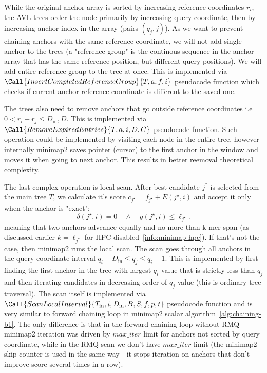While the original anchor array is sorted by increasing reference coordinates $r_i$, the AVL trees order the node primarily by increasing query coordinate, then by increasing anchor index in the array (pairs $(q_j, j)$).
As we want to prevent chaining anchors with the same reference coordinate, we will not add single anchor to the trees (a "reference group" is the continous sequence in the anchor array that has the same reference position, but different query positions).
We will add entire reference group to the tree at once. This is implemented via $\Call{InsertCompletedReferenceGroup}{T,a,f,i}$ pseudocode function which checks if current anchor reference coordinate is different to the saved one.

The trees also need to remove anchors that go outside reference coordinates i.e \(0<r_i-r_j\leq D_{\mathrm{in}}, D\). This is implemented via $\Call{RemoveExpiredEntries}{T,a,i,D,C}$ pseudocode function. Such operation could be implemented by visiting each node in the entire tree, however internally minimap2 saves
pointer (cursor) to the first anchor in the window and moves it when going to next anchor. This results in better reemoval theoretical complexity. 

The last complex operation is local scan. After best candidate $j^{*}$ is selected from the main tree $T$, we calculate it's score \(c_{j^\star}=f_{j^\star}+E(j^\star,i)\) and accept it only when the anchor is "exact":
\begin{equation}
  \delta(j^\star,i)=0
  \quad\land\quad
  g(j^\star,i)\leq\ell_{j^\star}.
  \label{eq:chaining-rmq-exact}
\end{equation}
meaning that two anchors advcance equally and no more than k-mer span (as discussed earlier $k = \ell_{j^\star}$ for HPC disabled~\ref{info:minimap-hpc}). 
If that's not the case, then minimap2 runs the local scan. The scan goes through all anchors in the query coordinate interval $q_i-D_{\mathrm{in}}\leq q_j\leq q_i-1$.
This is implemented by first finding the first anchor in the tree with largest $q_i$ value that is strictly less than $q_j$ and then iterating candidates in decreasing order of $q_j$ value (this is ordinary tree traversal).
The scan itself is implemented via $\Call{ScanLocalInterval}{T_{\mathrm{in}},i,D_{\mathrm{in}},B,S,f,p,t}$ pseudocode function and is very similar to forward chaining loop in minimap2 scalar algorithm~\ref{alg:chaining-b1}. The only difference is that in the forward chaining loop without RMQ
minimap2 iteration was driven by $max\_iter$ limit for anchors not sorted by query coordinate, while in the RMQ scan we don't have $max\_iter$ limit (the minimap2 skip counter is used in the same way - it stops iteration on anchors that don't improve score several times in a row).

